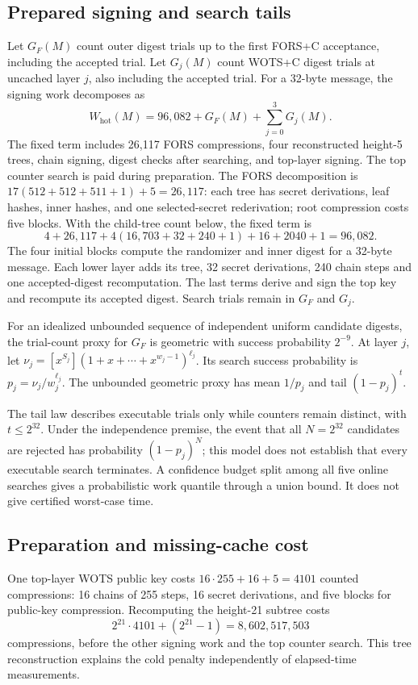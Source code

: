 \documentclass[a4paper,envcountsame,runningheads]{llncs}
\begin{document}
\subsection{Prepared signing and search tails}
Let $G_F(M)$ count outer digest trials up to the first FORS+C acceptance, including the accepted trial. Let $G_j(M)$ count WOTS+C digest trials at uncached layer $j$, also including the accepted trial. For a 32-byte message, the signing work decomposes as
\begin{equation}\label{eq:signwork}
 W_{\mathrm{hot}}(M)=96{,}082+G_F(M)+\sum_{j=0}^{3}G_j(M).
\end{equation}
The fixed term includes 26,117 FORS compressions, four reconstructed height-5 trees, chain signing, digest checks after searching, and top-layer signing. The top counter search is paid during preparation. The FORS decomposition is $17(512+512+511+1)+5=26{,}117$: each tree has secret derivations, leaf hashes, inner hashes, and one selected-secret rederivation; root compression costs five blocks. With the child-tree count below, the fixed term is
\[
 4+26{,}117+4(16{,}703+32+240+1)+16+2040+1=96{,}082.
\]
The four initial blocks compute the randomizer and inner digest for a 32-byte message. Each lower layer adds its tree, 32 secret derivations, 240 chain steps and one accepted-digest recomputation. The last terms derive and sign the top key and recompute its accepted digest. Search trials remain in $G_F$ and $G_j$.

For an idealized unbounded sequence of independent uniform candidate digests, the trial-count proxy for $G_F$ is geometric with success probability $2^{-9}$. At layer $j$, let $\nu_j=[x^{S_j}](1+x+\cdots+x^{w_j-1})^{\ell_j}$. Its search success probability is $p_j=\nu_j/w_j^{\ell_j}$. The unbounded geometric proxy has mean $1/p_j$ and tail $(1-p_j)^t$.

The tail law describes executable trials only while counters remain distinct, with $t\le 2^{32}$. Under the independence premise, the event that all $N=2^{32}$ candidates are rejected has probability $(1-p_j)^N$; this model does not establish that every executable search terminates. A confidence budget split among all five online searches gives a probabilistic work quantile through a union bound. It does not give certified worst-case time.

\subsection{Preparation and missing-cache cost}
One top-layer WOTS public key costs $16\cdot255+16+5=4101$ counted compressions: 16 chains of 255 steps, 16 secret derivations, and five blocks for public-key compression. Recomputing the height-21 subtree costs
\[
 2^{21}\cdot4101+(2^{21}-1)=8{,}602{,}517{,}503
\]
compressions, before the other signing work and the top counter search. This tree reconstruction explains the cold penalty independently of elapsed-time measurements.
\end{document}
